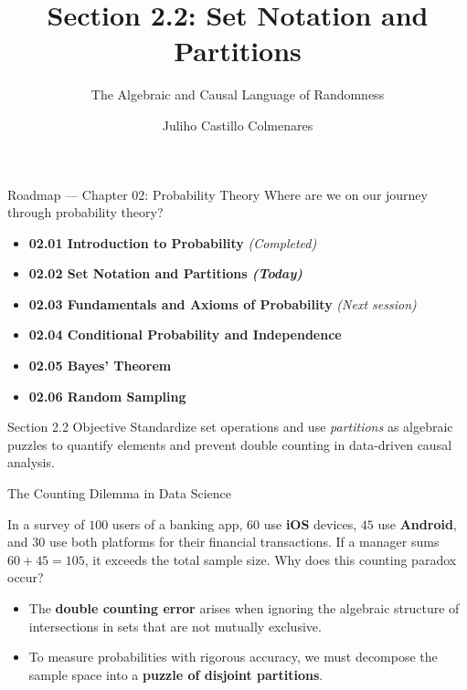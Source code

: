 \documentclass[10pt,aspectratio=169]{beamer}
\title[Set Notation and Partitions]{Section 2.2: Set Notation and Partitions}
\subtitle{The Algebraic and Causal Language of Randomness}
\author[J. Castillo Colmenares]{Juliho Castillo Colmenares}
\institute{Tecnológico de Monterrey}
\date{}
\begin{document}
\begin{frame}[plain]
  \titlepage
\end{frame}

\begin{frame}{Roadmap — Chapter 02: Probability Theory}
  Where are we on our journey through probability theory? \pause
  \begin{itemize}
    \item \textbf{02.01 Introduction to Probability} \emph{(Completed)} \pause
    \item \color{TecRojo}\textbf{02.02 Set Notation and Partitions \emph{(Today)}}\color{black} \pause
    \item \textbf{02.03 Fundamentals and Axioms of Probability} \emph{(Next session)} \pause
    \item \textbf{02.04 Conditional Probability and Independence} \pause
    \item \textbf{02.05 Bayes' Theorem} \pause
    \item \textbf{02.06 Random Sampling}
  \end{itemize}
  \vspace{0.6em}
  \begin{block}{Section 2.2 Objective}
    Standardize set operations and use \emph{partitions} as algebraic puzzles to quantify elements and prevent double counting in data-driven causal analysis.
  \end{block}
\end{frame}

\begin{frame}{The Counting Dilemma in Data Science}
  \begin{motivacion}
    In a survey of $100$ users of a banking app, $60$ use \textbf{iOS} devices, $45$ use \textbf{Android}, and $30$ use both platforms for their financial transactions. If a manager sums $60 + 45 = 105$, it exceeds the total sample size. Why does this counting paradox occur?
  \end{motivacion}
  
  \vspace{0.4em}
  \pause
  \begin{itemize}
    \item The \textbf{double counting error} arises when ignoring the algebraic structure of intersections in sets that are not mutually exclusive. \pause
    \item To measure probabilities with rigorous accuracy, we must decompose the sample space into a \textbf{puzzle of disjoint partitions}.
  \end{itemize}
\end{frame}
\end{document}
